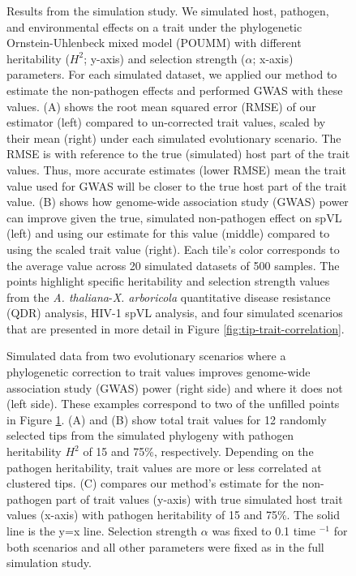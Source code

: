 \documentclass[11pt]{article}
\begin{document}
\begin{figure}[H]
	\begin{center}
		\caption{Results from the simulation study. We simulated host, pathogen, and environmental effects on a trait under the phylogenetic Ornstein-Uhlenbeck mixed model (POUMM) with different heritability ($H^2$; y-axis) and selection strength ($\alpha$; x-axis) parameters. For each simulated dataset, we applied our method to estimate the non-pathogen effects and performed GWAS with these values. (A) shows the root mean squared error (RMSE) of our estimator (left) compared to un-corrected trait values, scaled by their mean (right) under each simulated evolutionary scenario. The RMSE is with reference to the true (simulated) host part of the trait values. Thus, more accurate estimates (lower RMSE) mean the trait value used for GWAS will be closer to the true host part of the trait value. (B) shows how genome-wide association study (GWAS) power can improve given the true, simulated non-pathogen effect on spVL (left) and using our estimate for this value (middle) compared to using the scaled trait value (right). Each tile's color corresponds to the average value across 20 simulated datasets of 500 samples. The points highlight specific heritability and selection strength values from the \emph{A. thaliana}-\emph{X. arboricola} quantitative disease resistance (QDR) analysis, HIV-1 spVL analysis, and four simulated scenarios that are presented in more detail in Figure \ref{fig:tip-trait-correlation}.}
		\label{fig:simulationResults}
	\end{center}
\end{figure}

\begin{figure}[H]
	\begin{center}
		\caption{Simulated data from two evolutionary scenarios where a phylogenetic correction to trait values improves genome-wide association study (GWAS) power (right side) and where it does not (left side). These examples correspond to two of the unfilled points in Figure \ref{fig:simulationResults}. (A) and (B) show total trait values for 12 randomly selected tips from the simulated phylogeny with pathogen heritability $H^2$ of 15 and 75\%, respectively. Depending on the pathogen heritability, trait values are more or less correlated at clustered tips. (C) compares our method's estimate for the non-pathogen part of trait values (y-axis) with true simulated host trait values (x-axis) with pathogen heritability of 15 and 75\%. The solid line is the y=x line. Selection strength $\alpha$ was fixed to 0.1 time $^{-1}$ for both scenarios and all other parameters were fixed as in the full simulation study.}
		\label{fig:simulationTraitExample}
	\end{center}
\end{figure}
\end{document}
